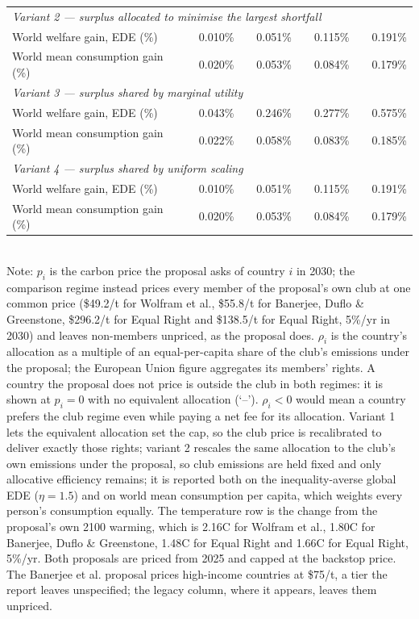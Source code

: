 \begin{table}[htbp]
\begin{tabular}{lcccccccc}
  \midrule
  \multicolumn{9}{l}{\textit{Variant 2 --- surplus allocated to minimise the largest shortfall}} \\
  \quad World welfare gain, EDE (\%) &  & 0.010\% &  & 0.051\% &  & 0.115\% &  & 0.191\% \\
  \quad World mean consumption gain (\%) &  & 0.020\% &  & 0.053\% &  & 0.084\% &  & 0.179\% \\
  \midrule
  \multicolumn{9}{l}{\textit{Variant 3 --- surplus shared by marginal utility}} \\
  \quad World welfare gain, EDE (\%) &  & 0.043\% &  & 0.246\% &  & 0.277\% &  & 0.575\% \\
  \quad World mean consumption gain (\%) &  & 0.022\% &  & 0.058\% &  & 0.083\% &  & 0.185\% \\
  \midrule
  \multicolumn{9}{l}{\textit{Variant 4 --- surplus shared by uniform scaling}} \\
  \quad World welfare gain, EDE (\%) &  & 0.010\% &  & 0.051\% &  & 0.115\% &  & 0.191\% \\
  \quad World mean consumption gain (\%) &  & 0.020\% &  & 0.053\% &  & 0.084\% &  & 0.179\% \\
  \bottomrule
\end{tabular}
\label{tab:equiv_rights_A}
\\[4pt]
{\footnotesize Note: $p_i$ is the carbon price the proposal asks of country $i$ in 2030; the comparison regime instead prices every member of the proposal's own club at one common price (\$49.2/t for Wolfram et al., \$55.8/t for Banerjee, Duflo \& Greenstone, \$296.2/t for Equal Right and \$138.5/t for Equal Right, 5\%/yr in 2030) and leaves non-members unpriced, as the proposal does. $\rho_i$ is the country's allocation as a multiple of an equal-per-capita share of the club's emissions under the proposal; the European Union figure aggregates its members' rights. A country the proposal does not price is outside the club in both regimes: it is shown at $p_i=0$ with no equivalent allocation (`--'). $\rho_i < 0$ would mean a country prefers the club regime even while paying a net fee for its allocation. Variant 1 lets the equivalent allocation set the cap, so the club price is recalibrated to deliver exactly those rights; variant 2 rescales the same allocation to the club's own emissions under the proposal, so club emissions are held fixed and only allocative efficiency remains; it is reported both on the inequality-averse global EDE ($\eta=1.5$) and on world mean consumption per capita, which weights every person's consumption equally. The temperature row is the change from the proposal's own 2100 warming, which is 2.16\textdegree{}C for Wolfram et al., 1.80\textdegree{}C for Banerjee, Duflo \& Greenstone, 1.48\textdegree{}C for Equal Right and 1.66\textdegree{}C for Equal Right, 5\%/yr. Both proposals are priced from 2025 and capped at the backstop price. The Banerjee et al. proposal prices high-income countries at \$75/t, a tier the report leaves unspecified; the legacy column, where it appears, leaves them unpriced.}
\end{table}
